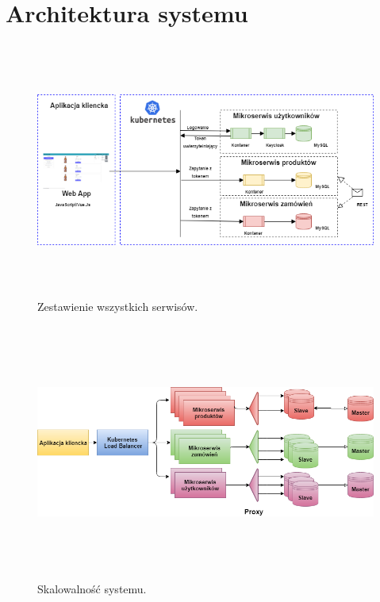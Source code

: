 \documentclass[11pt,a4paper,twoside]{article}
\begin{document}
\section{Architektura systemu}
\begin{figure}[ht]
\caption{Zestawienie wszystkich serwisów.}
\label{wszystkieSerwisy}
\centering
\includegraphics[height=8.4cm, width=15.7cm]{rso_services}
\end{figure}

\begin{figure}[ht]
\caption{Skalowalność systemu.}
\label{skalowalnosc}
\centering
\includegraphics[height=8.4cm, width=15.7cm]{architektura_replikacja}
\end{figure}
\end{document}
